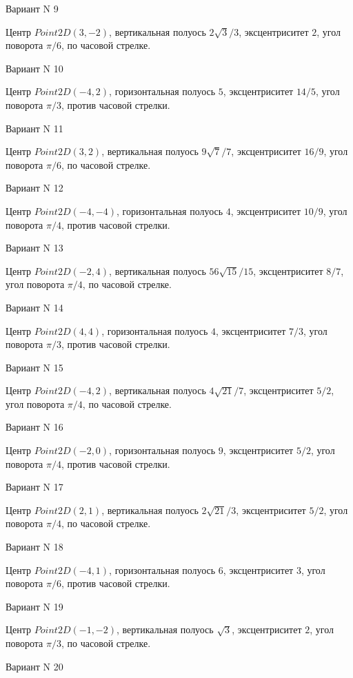 \documentclass[11pt]{report}
\begin{document}
Вариант N 9

Центр $Point2D\left(3, -2\right)$, вертикальная полуось $2 \sqrt{3} / 3$, эксцентриситет $2$, угол поворота $\pi / 6$, по часовой стрелке.

Вариант N 10

Центр $Point2D\left(-4, 2\right)$, горизонтальная полуось $5$, эксцентриситет $14 / 5$, угол поворота $\pi / 3$, против часовой стрелки.

Вариант N 11

Центр $Point2D\left(3, 2\right)$, вертикальная полуось $9 \sqrt{7} / 7$, эксцентриситет $16 / 9$, угол поворота $\pi / 6$, по часовой стрелке.

Вариант N 12

Центр $Point2D\left(-4, -4\right)$, горизонтальная полуось $4$, эксцентриситет $10 / 9$, угол поворота $\pi / 4$, против часовой стрелки.

Вариант N 13

Центр $Point2D\left(-2, 4\right)$, вертикальная полуось $56 \sqrt{15} / 15$, эксцентриситет $8 / 7$, угол поворота $\pi / 4$, по часовой стрелке.

Вариант N 14

Центр $Point2D\left(4, 4\right)$, горизонтальная полуось $4$, эксцентриситет $7 / 3$, угол поворота $\pi / 3$, против часовой стрелки.

Вариант N 15

Центр $Point2D\left(-4, 2\right)$, вертикальная полуось $4 \sqrt{21} / 7$, эксцентриситет $5 / 2$, угол поворота $\pi / 4$, по часовой стрелке.

Вариант N 16

Центр $Point2D\left(-2, 0\right)$, горизонтальная полуось $9$, эксцентриситет $5 / 2$, угол поворота $\pi / 4$, против часовой стрелки.

Вариант N 17

Центр $Point2D\left(2, 1\right)$, вертикальная полуось $2 \sqrt{21} / 3$, эксцентриситет $5 / 2$, угол поворота $\pi / 4$, по часовой стрелке.

Вариант N 18

Центр $Point2D\left(-4, 1\right)$, горизонтальная полуось $6$, эксцентриситет $3$, угол поворота $\pi / 6$, против часовой стрелки.

Вариант N 19

Центр $Point2D\left(-1, -2\right)$, вертикальная полуось $\sqrt{3}$, эксцентриситет $2$, угол поворота $\pi / 3$, по часовой стрелке.

Вариант N 20
\end{document}
